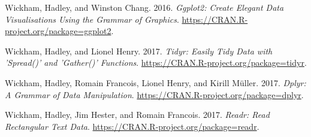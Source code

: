 \documentclass[12pt,]{krantz}
\theoremstyle{definition}
\theoremstyle{definition}
\theoremstyle{definition}
\theoremstyle{remark}
\begin{document}
\hypertarget{ref-R-ggplot2}{}
Wickham, Hadley, and Winston Chang. 2016. \emph{Ggplot2: Create Elegant
Data Visualisations Using the Grammar of Graphics}.
\url{https://CRAN.R-project.org/package=ggplot2}.

\hypertarget{ref-R-tidyr}{}
Wickham, Hadley, and Lionel Henry. 2017. \emph{Tidyr: Easily Tidy Data
with 'Spread()' and 'Gather()' Functions}.
\url{https://CRAN.R-project.org/package=tidyr}.

\hypertarget{ref-R-dplyr}{}
Wickham, Hadley, Romain Francois, Lionel Henry, and Kirill Müller. 2017.
\emph{Dplyr: A Grammar of Data Manipulation}.
\url{https://CRAN.R-project.org/package=dplyr}.

\hypertarget{ref-R-readr}{}
Wickham, Hadley, Jim Hester, and Romain Francois. 2017. \emph{Readr:
Read Rectangular Text Data}.
\url{https://CRAN.R-project.org/package=readr}.
\end{document}
